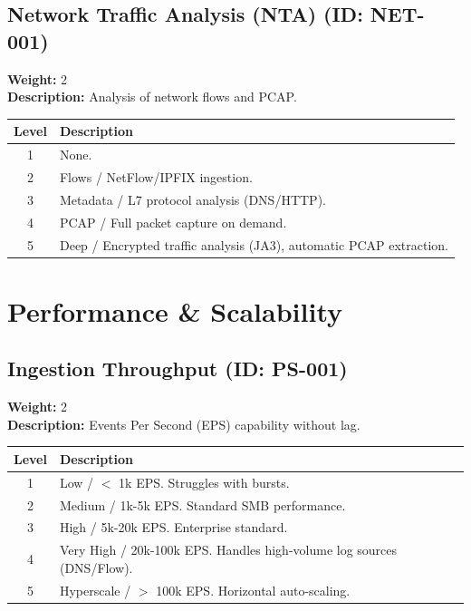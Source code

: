 \documentclass{article}
\begin{document}
\subsection{Network Traffic Analysis (NTA) (ID: NET-001)}
\textbf{Weight:} 2 \\
\textbf{Description:} Analysis of network flows and PCAP.
\vspace{0.3cm}
\begin{longtable}{|c|p{12cm}|}
\hline
\rowcolor{lightgray} \textbf{Level} & \textbf{Description} \\ \hline
1 & None. \\ \hline
2 & Flows / NetFlow/IPFIX ingestion. \\ \hline
3 & Metadata / L7 protocol analysis (DNS/HTTP). \\ \hline
4 & PCAP / Full packet capture on demand. \\ \hline
5 & Deep / Encrypted traffic analysis (JA3), automatic PCAP extraction. \\ \hline
\end{longtable}
\vspace{0.5cm}
\section{Performance \& Scalability}
\subsection{Ingestion Throughput (ID: PS-001)}
\textbf{Weight:} 2 \\
\textbf{Description:} Events Per Second (EPS) capability without lag.
\vspace{0.3cm}
\begin{longtable}{|c|p{12cm}|}
\hline
\rowcolor{lightgray} \textbf{Level} & \textbf{Description} \\ \hline
1 & Low / $<$ 1k EPS. Struggles with bursts. \\ \hline
2 & Medium / 1k-5k EPS. Standard SMB performance. \\ \hline
3 & High / 5k-20k EPS. Enterprise standard. \\ \hline
4 & Very High / 20k-100k EPS. Handles high-volume log sources (DNS/Flow). \\ \hline
5 & Hyperscale / $>$ 100k EPS. Horizontal auto-scaling. \\ \hline
\end{longtable}
\vspace{0.5cm}
\end{document}
